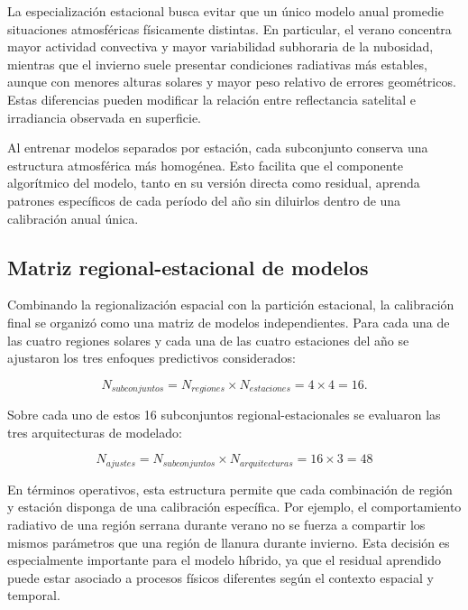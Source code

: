 \documentclass[../main.tex]{subfiles}
\begin{document}
La especialización estacional busca evitar que un único modelo anual promedie situaciones atmosféricas físicamente distintas. En particular, el verano concentra mayor actividad convectiva y mayor variabilidad subhoraria de la nubosidad, mientras que el invierno suele presentar condiciones radiativas más estables, aunque con menores alturas solares y mayor peso relativo de errores geométricos. Estas diferencias pueden modificar la relación entre reflectancia satelital e irradiancia observada en superficie.

Al entrenar modelos separados por estación, cada subconjunto conserva una estructura atmosférica más homogénea. Esto facilita que el componente algorítmico del modelo, tanto en su versión directa como residual, aprenda patrones específicos de cada período del año sin diluirlos dentro de una calibración anual única.

\subsection{Matriz regional-estacional de modelos}

Combinando la regionalización espacial con la partición estacional, la calibración final se organizó como una matriz de modelos independientes. Para cada una de las cuatro regiones solares y cada una de las cuatro estaciones del año se ajustaron los tres enfoques predictivos considerados:

\begin{equation}
N_{subconjuntos}
=
N_{regiones}
\times
N_{estaciones}
=
4 \times 4 =
16.
\end{equation}

Sobre cada uno de estos 16 subconjuntos regional-estacionales se evaluaron las tres arquitecturas de modelado:

\begin{equation}
N_{ajustes}
=
N_{subconjuntos}
\times
N_{arquitecturas}
=
16 \times 3 =
48
\end{equation}

En términos operativos, esta estructura permite que cada combinación de región y estación disponga de una calibración específica. Por ejemplo, el comportamiento radiativo de una región serrana durante verano no se fuerza a compartir los mismos parámetros que una región de llanura durante invierno. Esta decisión es especialmente importante para el modelo híbrido, ya que el residual aprendido puede estar asociado a procesos físicos diferentes según el contexto espacial y temporal.
\end{document}
